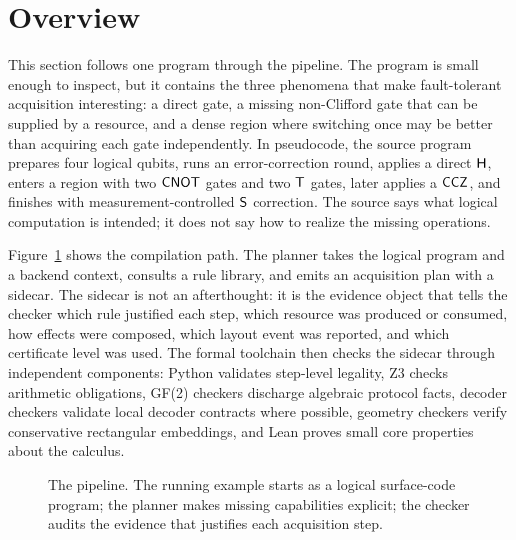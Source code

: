 \section{Overview}

This section follows one program through the \system pipeline.
The program is small enough to inspect, but it contains the three phenomena that make fault-tolerant acquisition interesting: a direct gate, a missing non-Clifford gate that can be supplied by a resource, and a dense region where switching once may be better than acquiring each gate independently.
In pseudocode, the source program prepares four  logical qubits, runs an error-correction round, applies a direct $\mathsf{H}$, enters a region with two $\mathsf{CNOT}$ gates and two $\mathsf{T}$ gates, later applies a $\mathsf{CCZ}$, and finishes with measurement-controlled $\mathsf{S}$ correction.
The source says what logical computation is intended; it does not say how to realize the missing operations.

Figure~\ref{fig:pipeline} shows the compilation path.
The planner takes the logical program and a backend context, consults a rule library, and emits an acquisition plan with a sidecar.
The sidecar is not an afterthought: it is the evidence object that tells the checker which rule justified each step, which resource was produced or consumed, how effects were composed, which layout event was reported, and which certificate level was used.
The formal toolchain then checks the sidecar through independent components: Python validates step-level legality, Z3 checks arithmetic obligations, GF(2) checkers discharge algebraic protocol facts, decoder checkers validate local decoder contracts where possible, geometry checkers verify conservative rectangular embeddings, and Lean proves small core properties about the calculus.

\begin{figure}[t]
\centering
{}
\caption{The \system pipeline. The running example starts as a logical surface-code program; the planner makes missing capabilities explicit; the checker audits the evidence that justifies each acquisition step.}
\label{fig:pipeline}
\end{figure}

